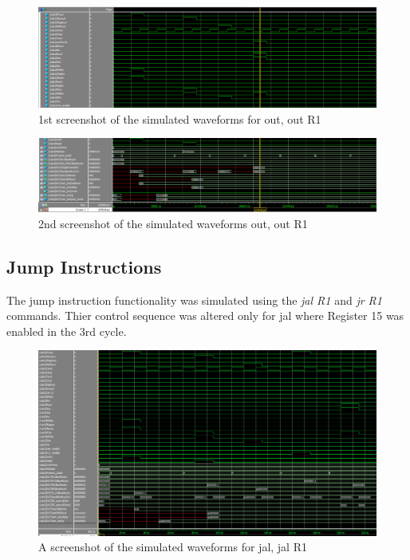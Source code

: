 \documentclass{article}
\begin{document}
        \begin{figure}[h!]
            \begin{center}
                \includegraphics[width=15cm]{out_wave_top_half.png}
                \caption{1st screenshot of the simulated waveforms for out, out R1}
            \end{center}
        \end{figure}

        \begin{figure}[h!]
            \begin{center}
                \includegraphics[width=15cm]{out_wave_bottom_half.png}
                \caption{2nd screenshot of the simulated waveforms out, out R1}
            \end{center}
        \end{figure}

    \subsection{Jump Instructions}
    The jump instruction functionality was simulated using the \emph{jal R1} and \emph{jr R1} commands. Thier control sequence was altered only for jal where Register 15 was enabled in the 3rd cycle.
      
        \begin{figure}[h!]
            \begin{center}
                \includegraphics[width=15cm]{jal_wave.png}
                \caption{A screenshot of the simulated waveforms for jal, jal R1}
            \end{center}
        \end{figure}
\end{document}
